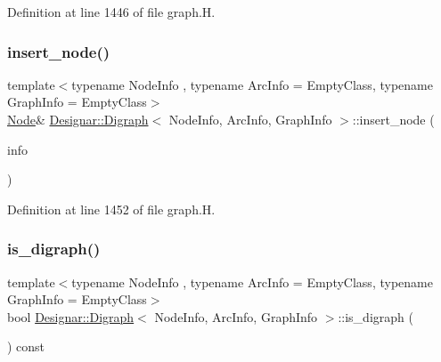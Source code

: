 Definition at line 1446 of file graph.\+H.

\mbox{\label{class_designar_1_1_digraph_a6b099922c3891b2c9fce75ffeedba025}} 
\subsubsection{\texorpdfstring{insert\+\_\+node()}{insert\_node()}\hspace{0.1cm}{\footnotesize\ttfamily [4/4]}}
{\footnotesize\ttfamily template$<$typename Node\+Info , typename Arc\+Info  = Empty\+Class, typename Graph\+Info  = Empty\+Class$>$ \\
\hyperlink{class_designar_1_1_digraph_a4dc921c41a480b7946a04170e997d8ae}{Node}\& \hyperlink{class_designar_1_1_digraph}{Designar\+::\+Digraph}$<$ Node\+Info, Arc\+Info, Graph\+Info $>$\+::insert\+\_\+node (\begin{DoxyParamCaption}\item[{Node\+Info \&\&}]{info }\end{DoxyParamCaption})\hspace{0.3cm}{\ttfamily [inline]}}



Definition at line 1452 of file graph.\+H.

\mbox{\label{class_designar_1_1_digraph_a6751952e13a35cf7aa452a8bb243f53d}} 
\subsubsection{\texorpdfstring{is\+\_\+digraph()}{is\_digraph()}}
{\footnotesize\ttfamily template$<$typename Node\+Info , typename Arc\+Info  = Empty\+Class, typename Graph\+Info  = Empty\+Class$>$ \\
bool \hyperlink{class_designar_1_1_digraph}{Designar\+::\+Digraph}$<$ Node\+Info, Arc\+Info, Graph\+Info $>$\+::is\+\_\+digraph (\begin{DoxyParamCaption}{ }\end{DoxyParamCaption}) const\hspace{0.3cm}{\ttfamily [inline]}}



